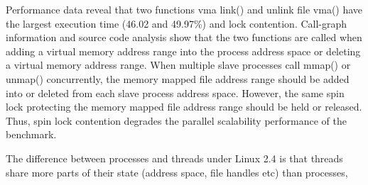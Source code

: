 Performance data reveal that two functions vma link() and
unlink file vma() have the largest execution time (46.02%
and 49.97\%) and lock contention. Call-graph information
and source code analysis show that the two functions are
called when adding a virtual memory address range into the
process address space or deleting a virtual memory address range. 
When multiple slave processes call mmap() or unmap() concurrently, the 
memory mapped file address range should be added into or 
deleted from each slave process address space. However, 
the same spin lock protecting the memory mapped file 
address range should be held or released. Thus, spin lock 
contention degrades the parallel scalability performance of 
the benchmark. 



The difference between processes and threads under Linux 2.4 is that threads share more parts of their state (address space, file handles etc) than processes, 
